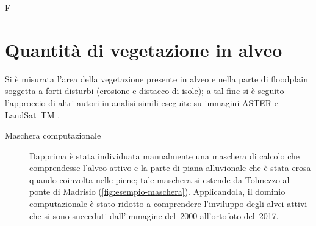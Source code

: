 F\section{Quantità di vegetazione in alveo}
Si è misurata l'area della vegetazione presente in alveo e nella parte di floodplain soggetta a forti disturbi (erosione e distacco di isole); 
a tal fine si è seguito l'approccio di altri autori in analisi simili eseguite su immagini ASTER e LandSat~TM .
%
\begin{description}
	\item[Maschera computazionale] 
	Dapprima è stata individuata manualmente una maschera di calcolo che comprendesse l'alveo attivo e la parte di piana alluvionale che è stata erosa quando coinvolta nelle piene; 
	tale maschera si estende da Tolmezzo al ponte di Madrisio
	(\vref{fig:esempio-maschera}). 
	Applicandola, il dominio computazionale è stato ridotto a comprendere l'inviluppo degli alvei attivi che si sono succeduti dall'immagine del~2000 all'ortofoto del~2017.
	\begin{figure}[t]
		\centering
		\begin{subfigure}[b]{0.296\textwidth}

\end{subfigure}
\end{figure}
\end{description}
